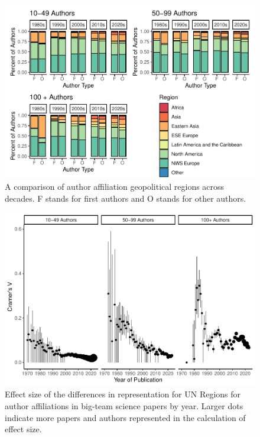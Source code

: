 \documentclass[
  man,mask,floatsintext]{apa7}
\begin{document}
\begin{figure}
\centering
\includegraphics{manuscript_scopus_files/figure-latex/fig-author-gpe-1.pdf}
\caption{\label{fig:fig-author-gpe}A comparison of author affiliation geopolitical regions across decades. F stands for first authors and O stands for other authors.}
\end{figure}

\begin{figure}
\centering
\includegraphics{manuscript_scopus_files/figure-latex/fig-effect-gpe-1.pdf}
\caption{\label{fig:fig-effect-gpe}Effect size of the differences in representation for UN Regions for author affiliations in big-team science papers by year. Larger dots indicate more papers and authors represented in the calculation of effect size.}
\end{figure}
\end{document}
